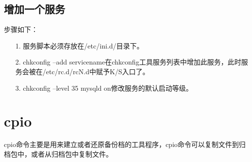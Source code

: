 \documentclass[a4paper,left=2.5cm,right=2.5cm,11pt]{article}
\begin{document}
\subsection{增加一个服务}
	步骤如下：
	\begin{itemize}
		\item[1.] 服务脚本必须存放在/etc/ini.d/目录下。
		\item[2.] chkconfig --add servicename在chkconfig工具服务列表中增加此服务，此时服务会被在/etc/rc.d/rcN.d中赋予K/S入口了。
		\item[3.] chkconfig --level 35 mysqld on修改服务的默认启动等级。 
	\end{itemize}

\section{cpio}
	cpio命令主要是用来建立或者还原备份档的工具程序，cpio命令可以复制文件到归档包中，或者从归档包中复制文件。\par
\end{document}
